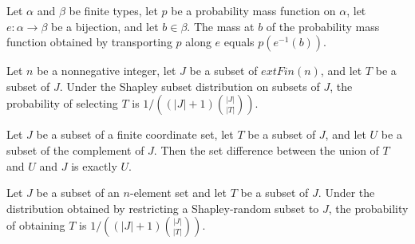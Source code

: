 \begin{theorem}
\label{FABL.pmf_map_equiv_apply}
\leanok
{}
Let $\alpha$ and $\beta$ be finite types, let $p$ be a probability mass function on
$\alpha$, let $e:\alpha\to\beta$ be a bijection, and let $b\in\beta$. The mass at $b$ of
the probability mass function obtained by transporting $p$ along $e$ equals
$p(e^{-1}(b))$.
\end{theorem}

\begin{theorem}
\label{FABL.shapleySubsetPMFOn_apply_toReal}
\leanok
{}
Let $n$ be a nonnegative integer, let $J$ be a subset of $	ext{Fin}(n)$, and let $T$ be
a subset of $J$. Under the Shapley subset distribution on subsets of $J$, the
probability of selecting $T$ is $1/((|J|+1)\binom{|J|}{|T|})$.
\end{theorem}

\begin{theorem}
\label{FABL.sdiff_lift_union_compl}
\leanok
{}
Let $J$ be a subset of a finite coordinate set, let $T$ be a subset of $J$, and let $U$
be a subset of the complement of $J$. Then the set difference between the union of $T$
and $U$ and $J$ is exactly $U$.
\end{theorem}

\begin{theorem}
\label{FABL.shapleySubsetMarginalPMF_apply_toReal}
\leanok
{}
Let $J$ be a subset of an $n$-element set and let $T$ be a subset of $J$. Under the
distribution obtained by restricting a Shapley-random subset to $J$, the probability of
obtaining $T$ is $1/((|J|+1)\binom{|J|}{|T|})$.
\end{theorem}


